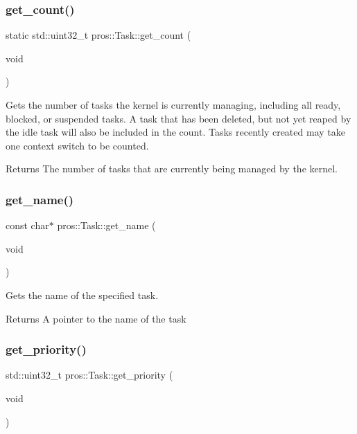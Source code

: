 \subsubsection{\texorpdfstring{get\+\_\+count()}{get\_count()}}
{\footnotesize\ttfamily static std\+::uint32\+\_\+t pros\+::\+Task\+::get\+\_\+count (\begin{DoxyParamCaption}\item[{void}]{ }\end{DoxyParamCaption})\hspace{0.3cm}{\ttfamily [static]}}

Gets the number of tasks the kernel is currently managing, including all ready, blocked, or suspended tasks. A task that has been deleted, but not yet reaped by the idle task will also be included in the count. Tasks recently created may take one context switch to be counted.

\begin{DoxyReturn}{Returns}
The number of tasks that are currently being managed by the kernel. 
\end{DoxyReturn}
\mbox{\label{classpros_1_1Task_a3c559d11cf602b99fc870b8be43fe191}} 
\subsubsection{\texorpdfstring{get\+\_\+name()}{get\_name()}}
{\footnotesize\ttfamily const char$\ast$ pros\+::\+Task\+::get\+\_\+name (\begin{DoxyParamCaption}\item[{void}]{ }\end{DoxyParamCaption})}

Gets the name of the specified task.

\begin{DoxyReturn}{Returns}
A pointer to the name of the task 
\end{DoxyReturn}
\mbox{\label{classpros_1_1Task_a97e11478bd99181a664ed6e975fdb248}} 
\subsubsection{\texorpdfstring{get\+\_\+priority()}{get\_priority()}}
{\footnotesize\ttfamily std\+::uint32\+\_\+t pros\+::\+Task\+::get\+\_\+priority (\begin{DoxyParamCaption}\item[{void}]{ }\end{DoxyParamCaption})}

